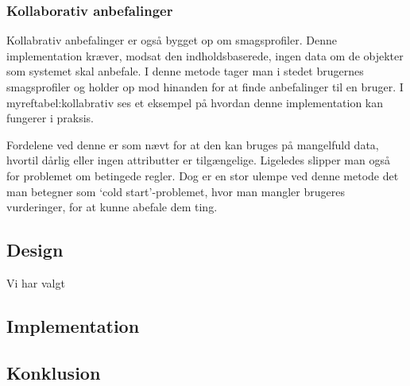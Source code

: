 \subsubsection{Kollaborativ anbefalinger}
Kollabrativ anbefalinger er også bygget op om smagsprofiler.
Denne implementation kræver, modsat den indholdsbaserede, ingen data om de objekter som systemet skal anbefale. I denne metode tager man i stedet brugernes smagsprofiler og holder op mod hinanden for at finde anbefalinger til en bruger. I myref{tabel:kollabrativ} ses et eksempel på hvordan denne implementation kan fungerer i praksis.

Fordelene ved denne er som nævt for at den kan bruges på mangelfuld data, hvortil dårlig eller ingen attributter er tilgængelige.
Ligeledes slipper man også for problemet om betingede regler.
Dog er en stor ulempe ved denne metode det man betegner som ‘cold start’-problemet, hvor man mangler brugeres vurderinger, for at kunne abefale dem ting\citep{RecommenderSystems}.

\subsection{Design}
Vi har valgt


\subsection{Implementation}

\subsection{Konklusion}
